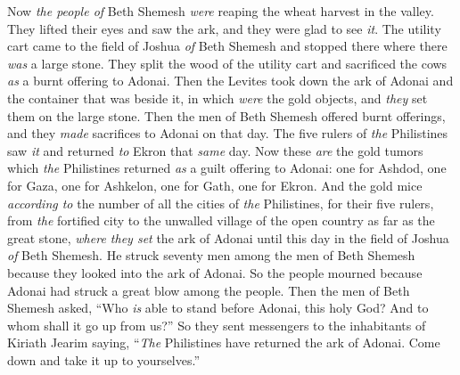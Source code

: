 \begin{biblechapter}
\verse Now \textit{the people of} Beth Shemesh \textit{were} reaping the wheat harvest in the valley. They lifted their eyes and saw the ark, and they were glad to see \textit{it}.
\verse The utility cart came to the field of Joshua \textit{of} Beth Shemesh and stopped there where there \textit{was} a large stone. They split the wood of the utility cart and sacrificed the cows \textit{as} a burnt offering to Adonai.
\verse Then the Levites took down the ark of Adonai and the container that was beside it, in which \textit{were} the gold objects, and \textit{they} set them on the large stone. Then the men of Beth Shemesh offered burnt offerings, and they \textit{made} sacrifices to Adonai on that day.
\verse The five rulers of \textit{the} Philistines saw \textit{it} and returned \textit{to} Ekron that \textit{same} day.
\verse Now these \textit{are} the gold tumors which \textit{the} Philistines returned \textit{as} a guilt offering to Adonai: one for Ashdod, one for Gaza, one for Ashkelon, one for Gath, one for Ekron.
\verse And the gold mice \textit{according to} the number of all the cities of \textit{the} Philistines, for their five rulers, from \textit{the} fortified city to the unwalled village of the open country as far as the great stone, \textit{where they set} the ark of Adonai until this day in the field of Joshua \textit{of} Beth Shemesh.
\verse He struck seventy men among the men of Beth Shemesh because they looked into the ark of Adonai. So the people mourned because Adonai had struck a great blow among the people.
\verse Then the men of Beth Shemesh asked, “Who \textit{is} able to stand before Adonai, this holy God? And to whom shall it go up from us?”
\verse So they sent messengers to the inhabitants of Kiriath Jearim saying, “\textit{The} Philistines have returned the ark of Adonai. Come down and take it up to yourselves.”
\end{biblechapter}

